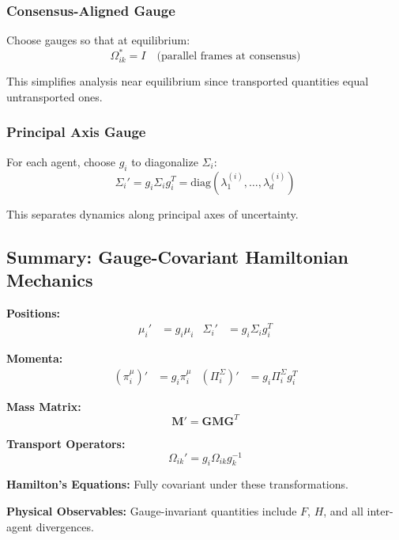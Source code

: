 \documentclass[12pt]{article}
\begin{document}
\subsubsection{Consensus-Aligned Gauge}

Choose gauges so that at equilibrium:
\begin{equation}
\Omega_{ik}^* = I \quad \text{(parallel frames at consensus)}
\end{equation}

This simplifies analysis near equilibrium since transported quantities equal untransported ones.

\subsubsection{Principal Axis Gauge}

For each agent, choose $g_i$ to diagonalize $\Sigma_i$:
\begin{equation}
\Sigma_i' = g_i\Sigma_i g_i^T = \mathrm{diag}(\lambda_1^{(i)}, \ldots, \lambda_d^{(i)})
\end{equation}

This separates dynamics along principal axes of uncertainty.

\subsection{Summary: Gauge-Covariant Hamiltonian Mechanics}

\begin{tcolorbox}[title=Gauge Transformation Laws]
\textbf{Positions:}
\begin{align}
\mu_i' &= g_i\mu_i & \Sigma_i' &= g_i\Sigma_i g_i^T
\end{align}

\textbf{Momenta:}
\begin{align}
(\pi_i^\mu)' &= g_i\pi_i^\mu & (\Pi_i^\Sigma)' &= g_i\Pi_i^\Sigma g_i^T
\end{align}

\textbf{Mass Matrix:}
\begin{equation}
\mathbf{M}' = \mathbf{G}\mathbf{M}\mathbf{G}^T
\end{equation}

\textbf{Transport Operators:}
\begin{equation}
\Omega_{ik}' = g_i\Omega_{ik}g_k^{-1}
\end{equation}

\textbf{Hamilton's Equations:} Fully covariant under these transformations.

\textbf{Physical Observables:} Gauge-invariant quantities include $F$, $H$, and all inter-agent divergences.
\end{tcolorbox}
\end{document}
